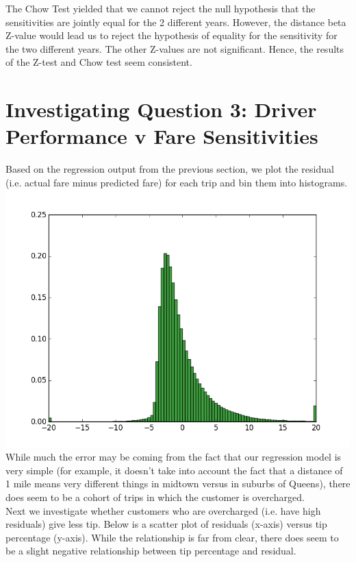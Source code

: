 \documentclass[twoside]{article}
\begin{document}
\begin{multicols}{2}
The Chow Test yielded that we cannot reject the null hypothesis that the sensitivities are jointly equal for the 2 different years. However, the distance beta Z-value would lead us to reject the hypothesis of equality for the sensitivity for the two different years. The other Z-values are not significant. Hence, the results of the Z-test and Chow test seem consistent. 


\section{Investigating Question 3: Driver Performance v Fare Sensitivities}
Based on the regression output from the previous section, we plot the residual (i.e. actual fare minus predicted fare) for each trip and bin them into histograms.  
\includegraphics[scale=.35]{figure_1.png}
While much the error may be coming from the fact that our regression model is very simple (for example, it doesn't take into account the fact that a distance of 1 mile means very different things in midtown versus in suburbs of Queens), there does seem to be a cohort of trips in which the customer is overcharged. \\
Next we investigate whether customers who are overcharged (i.e. have high residuals) give less tip. Below is a scatter plot of residuals (x-axis) versus tip percentage (y-axis). While the relationship is far from clear, there does seem to be a slight negative relationship between tip percentage and residual.

\end{multicols}
\end{document}
